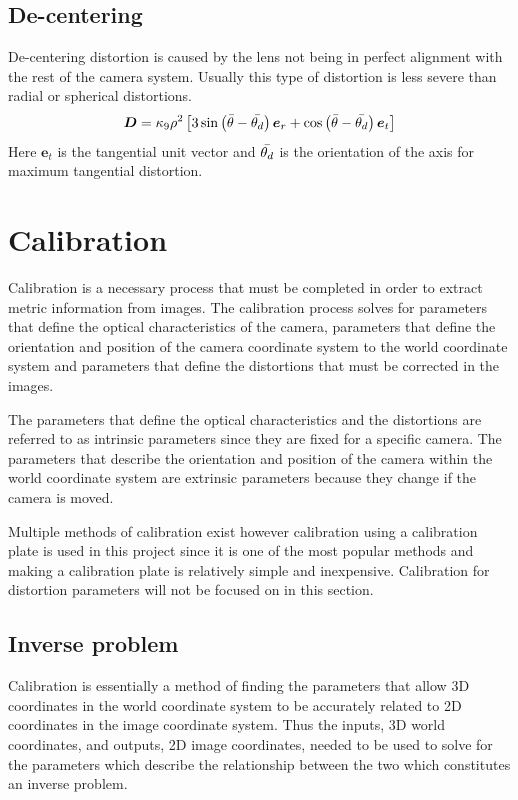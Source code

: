 \subsection{De-centering}
De-centering distortion is caused by the lens not being in perfect alignment with the rest of the camera system. Usually this type of distortion is less severe than radial or spherical distortions.
\begin{equation}
	\bm{D} = \kappa_9 \rho^2 \left[ 3 \sin \left( \bar{\theta} - \bar{\theta_d} \right) \bm{e}_r + \cos \left( \bar{\theta} - \bar{\theta_d} \right) \bm{e}_t \right]
\end{equation}
Here $\bm{e}_t$ is the tangential unit vector and $\bar{\theta_d}$ is the orientation of the axis for maximum tangential distortion.

\section{Calibration}
Calibration is a necessary process that must be completed in order to extract metric information from images. The calibration process solves for parameters that define the optical characteristics of the camera, parameters that define the orientation and position of the camera coordinate system to the world coordinate system and parameters that define the distortions that must be corrected in the images. 

The parameters that define the optical characteristics and the distortions are referred to as intrinsic parameters since they are fixed for a specific camera. The parameters that describe the orientation and position of the camera within the world coordinate system are extrinsic parameters because they change if the camera is moved. 

Multiple methods of calibration exist however calibration using a calibration plate is used in this project since it is one of the most popular methods and making a calibration plate is relatively simple and inexpensive. Calibration for distortion parameters will not be focused on in this section. 

\subsection{Inverse problem}
Calibration is essentially a method of finding the parameters that allow 3D coordinates in the world coordinate system to be accurately related to 2D coordinates in the image coordinate system. Thus the inputs, 3D world coordinates, and outputs, 2D image coordinates, needed to be used to solve for the parameters which describe the relationship between the two which constitutes an inverse problem.

